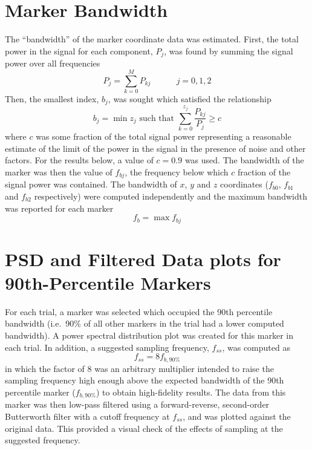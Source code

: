 \documentclass[
  a4paper,
  11pt,
  twoside,
  toc=flat,
  listof=flat
]{scrbook}
\begin{document}
\section{Marker Bandwidth}

The ``bandwidth'' of the marker coordinate data was estimated.  First, the total power in the signal for each component, $P_j$, was found by summing the signal power over all frequencies
\begin{equation}
P_j = \sum_{k=0}^{M} P_{kj} \hspace{3em} j = 0, 1, 2
\end{equation}
Then, the smallest index, $b_j$, was sought which satisfied the relationship
\begin{equation}
b_j = \min z_j \text{ such that } \sum_{k=0}^{z_j} \frac{P_{kj}}{P_j} \ge c
\end{equation}
where $c$ was some fraction of the total signal power representing a reasonable estimate of the limit of the power in the signal in the presence of noise and other factors.  For the results below, a value of $c = 0.9$ was used.  The bandwidth of the marker was then the value of $f_{bj}$, the frequency below which $c$ fraction of the signal power was contained.  The bandwidth of $x$, $y$ and $z$ coordinates ($f_{b0}$, $f_{b1}$ and $f_{b2}$ respectively) were computed independently and the maximum bandwidth was reported for each marker
\begin{equation}
f_b = \max f_{bj}
\end{equation}

\section{PSD and Filtered Data plots for 90th-Percentile Markers}

For each trial, a marker was selected which occupied the 90th percentile bandwidth (i.e.\ 90\% of all other markers in the trial had a lower computed bandwidth).  A power spectral distribution plot was created for this marker in each trial.  In addition, a suggested sampling frequency, $f_{ss}$, was computed as
\begin{equation}
f_{ss} = 8 f_{b,90\%}
\end{equation}
in which the factor of 8 was an arbitrary multiplier intended to raise the sampling frequency high enough above the expected bandwidth of the 90th percentile marker ($f_{b,90\%}$) to obtain high-fidelity results.  The data from this marker was then low-pass filtered using a forward-reverse, second-order Butterworth filter with a cutoff frequency at $f_{ss}$, and was plotted against the original data.  This provided a visual check of the effects of sampling at the suggested frequency.
\end{document}
